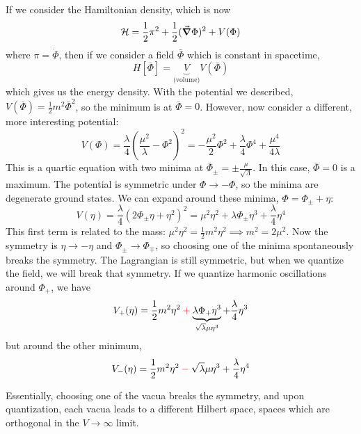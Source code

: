 \documentclass[a4paper,twoside,master.tex]{subfiles}
\begin{document}
If we consider the Hamiltonian density, which is now
\begin{equation}
    \mathcal{H} = \frac{1}{2} \pi^2 + \frac{1}{2} (\grad{\Phi})^2 + V(\Phi)
\end{equation}
where $ \pi = \dot{\Phi} $, then if we consider a field $ \bar{\Phi} $ which is constant in spacetime,
\begin{equation}
    H[\bar{\Phi}] = \underbrace{V}_{\text{(volume)}} V(\bar{\Phi})
\end{equation}
which gives us the energy density. With the potential we described, $ V(\bar{\Phi}) = \frac{1}{2} m^2 \bar{\Phi}^2 $, so the minimum is at $ \bar{\Phi} = 0 $. However, now consider a different, more interesting potential:
\begin{equation}
    V(\Phi) = \frac{\lambda}{4} \left( \frac{\mu^2}{\lambda} - \Phi^2 \right)^2 = - \frac{\mu^2}{2} \Phi^2 + \frac{\lambda}{4} \Phi^4 + \frac{\mu^4}{4 \lambda}
\end{equation}
This is a quartic equation with two minima at $ \bar{\Phi}_{\pm} = \pm \frac{\mu}{\sqrt{\Lambda}} $. In this case, $ \bar{\Phi} = 0 $ is a maximum. The potential is symmetric under $ \Phi \to - \Phi $, so the minima are degenerate ground states. We can expand around these minima, $ \Phi = \Phi_{\pm} + \eta $:
\begin{equation}
    V(\eta) = \frac{\lambda}{4} \left( 2 \Phi_{\pm} \eta + \eta^2 \right)^2 = \mu^2 \eta^2 + \lambda \Phi_{\pm} \eta^3 + \frac{\lambda}{4} \eta^4
\end{equation}
This first term is related to the mass: $ \mu^2 \eta^2 = \frac{1}{2} m^2 \eta^2 \implies m^2 = 2 \mu^2 $. Now the symmetry is $ \eta \to - \eta $ and $ \Phi_{\pm} \to \Phi_{\mp} $, so choosing one of the minima spontaneously breaks the symmetry. The Lagrangian is still symmetric, but when we quantize the field, we will break that symmetry. If we quantize harmonic oscillations around $ \Phi_+ $, we have
\begin{equation}
    V_{+}(\eta) = \frac{1}{2} m^2 \eta^2 \color{red}+\color{black} \underbrace{\lambda \Phi_+ \eta^3}_{\sqrt{\lambda} \mu \eta^3} + \frac{\lambda}{4} \eta^3
\end{equation}
but around the other minimum,
\begin{equation}
    V_-(\eta) = \frac{1}{2} m^2 \eta^2 \color{red}-\color{black} \sqrt{\lambda} \mu \eta^3 + \frac{\lambda}{4} \eta^4
\end{equation}

Essentially, choosing one of the vacua breaks the symmetry, and upon quantization, each vacua leads to a different Hilbert space, spaces which are orthogonal in the $ V \to \infty $ limit.
\end{document}
